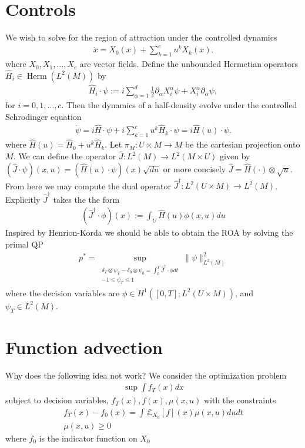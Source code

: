 \documentclass[12pt]{amsart}
\DeclareMathOperator{\Herm}{Herm}
\begin{document}
\section{Controls}
We wish to solve for the region of attraction under the controlled dynamics
\begin{align*}
	\dot{x} = X_0(x) + \sum_{k=1}^{c} u^k X_k(x).
\end{align*}
where $X_0,X_1,\dots,X_c$ are vector fields.
Define the unbounded Hermetian operators $\hat{H}_i \in \Herm(L^2(M) )$ by
\begin{align*}
	\hat{H}_i \cdot \psi := i \sum_{\alpha=1}^d   \frac{1}{2} \partial_\alpha X_i^\alpha  \psi + X_i^\alpha \partial_\alpha \psi,
\end{align*}
for $i=0,1,\dots,c$.
Then the dynamics of a half-density evolve under the controlled Schrodinger equation
\begin{align*}
	\dot{\psi} = i \hat{H} \cdot \psi + i \sum_{k=1}^c u^k \hat{H}_k \cdot \psi = i \hat{H}(u) \cdot \psi.
\end{align*}
where $\hat{H}(u) = \hat{H}_0 + u^k \hat{H}_k$.
Let $\pi_M : U \times M \to M$ be the cartesian projection onto $M$.
We can define the operator $\hat{J} : L^2(M) \to L^2(M \times U)$ given by $(\hat{J} \cdot \psi )(x,u)= (\hat{H}(u) \cdot \psi)(x) \sqrt{du}$
or more concisely $\hat{J} = \hat{H}(\cdot) \otimes \sqrt{u}$.
From here we may compute the dual operator $\hat{J}^\dagger : L^2( U \times M) \to L^2(M)$.
Explicitly $\hat{J}^\dagger$ takes the the form
\begin{align*}
	(\hat{J}^\dagger \cdot \phi )(x) :=  \int_U \hat{H}(u) \phi(x,u) du
\end{align*}
Inspired by Henrion-Korda we should be able to obtain the ROA by solving the primal QP
\begin{align*}
	p^* = \sup_{
		\substack{ \delta_T \otimes \psi_T - \delta_0 \otimes \psi_0 = \int_{0}^T \hat{J}^\dagger \cdot \phi dt \\ -1 \leq \psi_T \leq 1  }}
			 \| \psi \|_{L^2(M)}^2
\end{align*}
where the decision variables are $\phi \in H^1( [0,T] ; L^2(U \times M) )$, and $\psi_T  \in L^2(M)$.

\section{Function advection}
Why does the following idea not work?  We consider the optimization problem
\begin{align*}
	\sup \int f_T (x) dx 
\end{align*}
subject to decision variables, $f_T(x), f(x),\mu(x,u)$ with the constraints
\begin{align*}
	f_T(x) - f_0(x) = \int \pounds_{X_{u}} [f] (x) \mu(x,u) du dt \\
	\mu(x,u) \geq 0
\end{align*}
where $f_0$ is the indicator function on $X_0$


\end{document}
